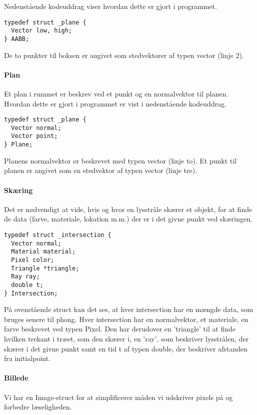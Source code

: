 Nedenstående kodeuddrag viser hvordan dette er gjort i programmet.

\begin{lstlisting}[style=Cstyle, caption=Struct til bounding boxes]
typedef struct _plane {
  Vector low, high;
} AABB;
\end{lstlisting}

De to punkter til boksen er angivet som stedvektorer af typen vector (linje 2).

\paragraph{Plan}
Et plan i rummet er beskrev ved et punkt og en normalvektor til planen. Hvordan dette er gjort i programmet er vist i nedenstående kodeuddrag. 

\begin{lstlisting}[style=Cstyle, caption=Struct til plan]
typedef struct _plane {
  Vector normal;
  Vector point;
} Plane;
\end{lstlisting}

Planens normalvektor er beskrevet med typen vector (linje to). Et punkt til planen er angivet som en stedvektor af typen vector (linje tre).

\paragraph{Skæring}
Det er nødvendigt at vide, hvis og hvor en lysstråle skærer et objekt, for at finde de data (farve, materiale, lokation m.m.) der er i det givne punkt ved skæringen.

\begin{lstlisting}[style=Cstyle, caption=Struct til intersection]
typedef struct _intersection {
  Vector normal;
  Material material;
  Pixel color;
  Triangle *triangle;
  Ray ray;
  double t;
} Intersection;
\end{lstlisting}

På ovenstående struct kan det ses, at hver intersection har en mængde data, som bruges senere til phong. Hver intersection har en 
normalvektor, et materiale, en farve beskrevet ved typen Pixel. Den har derudover en 'triangle' til at finde hvilken trekant i træet, som den skærer i, en 'ray', som beskriver lysstrålen, der skærer i det givne punkt samt en tid t af typen double, der beskriver afstanden fra initialpoint.

\paragraph{Billede}
Vi har en Image-struct for at simplificerer måden vi udskriver pixels på og forbedre læseligheden.

